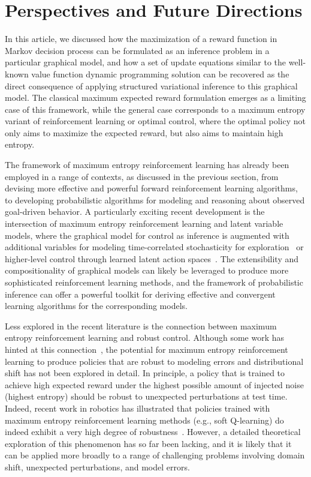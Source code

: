 \section{Perspectives and Future Directions}
\label{sec:future}

In this article, we discussed how the maximization of a reward function in Markov decision process can be formulated as an inference problem in a particular graphical model, and how a set of update equations similar to the well-known value function dynamic programming solution can be recovered as the direct consequence of applying structured variational inference to this graphical model. The classical maximum expected reward formulation emerges as a limiting case of this framework, while the general case corresponds to a maximum entropy variant of reinforcement learning or optimal control, where the optimal policy not only aims to maximize the expected reward, but also aims to maintain high entropy.

The framework of maximum entropy reinforcement learning has already been employed in a range of contexts, as discussed in the previous section, from devising more effective and powerful forward reinforcement learning algorithms, to developing probabilistic algorithms for modeling and reasoning about observed goal-driven behavior. A particularly exciting recent development is the intersection of maximum entropy reinforcement learning and latent variable models, where the graphical model for control as inference is augmented with additional variables for modeling time-correlated stochasticity for exploration~\citep{hausman,learning_to_explore} or higher-level control through learned latent action spaces~\citep{haarnoja,realnvp}. The extensibility and compositionality of graphical models can likely be leveraged to produce more sophisticated reinforcement learning methods, and the framework of probabilistic inference can offer a powerful toolkit for deriving effective and convergent learning algorithms for the corresponding models.

Less explored in the recent literature is the connection between maximum entropy reinforcement learning and robust control. Although some work has hinted at this connection~\citep{ziebart_thesis}, the potential for maximum entropy reinforcement learning to produce policies that are robust to modeling errors and distributional shift has not been explored in detail. In principle, a policy that is trained to achieve high expected reward under the highest possible amount of injected noise (highest entropy) should be robust to unexpected perturbations at test time. Indeed, recent work in robotics has illustrated that policies trained with maximum entropy reinforcement learning methods (e.g., soft Q-learning) do indeed exhibit a very high degree of robustness~\citep{haarnoja_composable}. However, a detailed theoretical exploration of this phenomenon has so far been lacking, and it is likely that it can be applied more broadly to a range of challenging problems involving domain shift, unexpected perturbations, and model errors.

